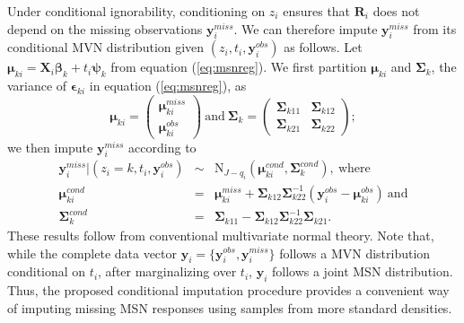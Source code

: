 \documentclass[useAMS,usenatbib,referee]{biom}
\begin{document}
Under conditional ignorability, conditioning on $z_i$ ensures that $\mathbf{R}_i$ does not depend on the missing observations $\mathbf{y}^{miss}_i$. We can therefore impute $\mathbf{y}^{miss}_i$ from its conditional MVN distribution given $(z_i,t_i,\mathbf{y}^{obs}_i)$ as follows. Let $\boldsymbol\mu_{ki}= \mathbf{X}_i \boldsymbol\beta_k + t_i \boldsymbol\psi_k$ from equation (\ref{eq:msnreg}). We first partition $\boldsymbol\mu_{ki}$ and $\boldsymbol\Sigma_k$, the variance of $\boldsymbol\epsilon_{ki}$ in equation (\ref{eq:msnreg}), as
\[
\boldsymbol\mu_{ki} = \begin{pmatrix} \boldsymbol\mu_{ki}^{miss} \\ \boldsymbol\mu_{ki}^{obs} \end{pmatrix}~\text{and}~
\boldsymbol\Sigma_k = \begin{pmatrix}
	\boldsymbol\Sigma_{k11} & \boldsymbol\Sigma_{k12}\\
	\boldsymbol\Sigma_{k21} & \boldsymbol\Sigma_{k22}\end{pmatrix};
\]
we then impute $\mathbf{y}^{miss}_i$ according to
\begin{eqnarray}
	\label{eq:cond_forms}
\mathbf{y}^{miss}_i|(z_i=k,t_i,\mathbf{y}^{obs}_i)&\sim& \text{N}_{J-q_i}(\boldsymbol\mu^{cond}_{ki},\boldsymbol\Sigma^{cond}_k),~\text{where}\nonumber\\
\boldsymbol\mu^{cond}_{ki}&=& \boldsymbol\mu^{miss}_{ki} + \boldsymbol\Sigma_{k12} \boldsymbol\Sigma_{k22}^{-1}(\mathbf{y}^{obs}_i - \boldsymbol\mu^{obs}_{ki})~\text{and}\label{eq:impute}  \\
\boldsymbol\Sigma^{cond}_k&=& \boldsymbol\Sigma_{k11} - \boldsymbol\Sigma_{k12}\boldsymbol\Sigma_{k22}^{-1}\boldsymbol\Sigma_{k21}.\nonumber
\end{eqnarray}
These results follow from conventional multivariate normal theory. Note that, while the complete data vector $\mathbf{y}_i=\{\mathbf{y}^{obs}_i,\mathbf{y}^{miss}_i\}$ follows a MVN distribution conditional on $t_i$, after marginalizing over $t_i$, $\mathbf{y}_i$ follows a joint MSN distribution. Thus, the proposed conditional imputation procedure provides a convenient way of imputing missing MSN responses using samples from more standard densities.
\end{document}
